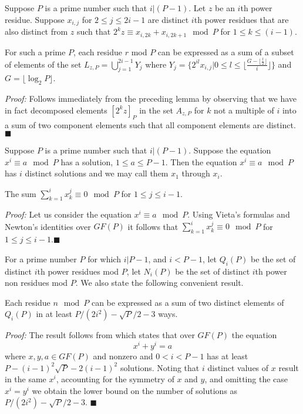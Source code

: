 \begin{lemma}\label{generates1} Suppose $P$ is a prime number such that $i|(P-1)$.
Let $z$ be an $i$th power residue. Suppose $x_{i,j}$ for $2 \leq j
\leq 2i-1$ are distinct $i$th power residues that are also
distinct from $z$ such that $2^{k}z \equiv x_{i,2k}+x_{i,2k+1}
\mod P$ for $1 \leq k \leq(i-1)$.

For such a prime $P$, each residue $r$ mod $P$ can be expressed as
a sum of a subset of elements of the set $L_{z,P}=
\bigcup_{j=1}^{2i-1} Y_j$ where $Y_j =\{2^{il}x_{i,j}| 0 \leq l
\leq \lfloor \frac{G-\lfloor \frac{l}{2}\rfloor}{i}\rfloor\}$ and
$G=\lfloor \log_2 P \rfloor $.
\end{lemma}
\noindent \textit{Proof:} Follows immediately from the preceding
lemma by observing that we have in fact decomposed elements
$[2^{k}z]_P$ in the set $A_{z,P}$ for $k$ not a multiple of $i$
into a sum of two component elements such that all component
elements are distinct.\hfill$\blacksquare$


Suppose $P$ is a prime number such that $i|(P-1)$. Suppose the
equation $x^i\equiv a \mod P$ has a solution, $1 \leq a \leq P-1$.
Then the equation $x^i\equiv a \mod P$ has $i$ distinct solutions
\cite{apostol} and we may call them $x_1$ through $x_i$.
\begin{lemma}\label{sums}
The sum $\sum_{k=1}^i x_k^j \equiv 0 \mod P$ for $1 \leq j \leq
i-1$.
\end{lemma}
\noindent \textit{Proof:} Let us consider the equation $x^i \equiv
a \mod P$. Using Vieta's formulas and Newton's identities over
$GF(P)$ it follows that
 $\sum_{k=1}^i x_k^j \equiv 0 \mod P$ for $1 \leq j \leq
i-1$.\hfill$\blacksquare$

For a prime number $P$ for which $i|P-1$, and $i<P-1$, let
$Q_i(P)$ be the set of distinct $i$th power residues mod $P$, let
$N_i(P)$ be the set of distinct $i$th power non residues mod $P$.
We also state the following convenient result.
\begin{lemma}\label{sums1}
Each residue $n \mod P$ can be expressed as a sum of two distinct
elements of $Q_i(P)$ in at least $P/(2i^2)-\sqrt{P}/2-3$ ways.
\end{lemma}
\noindent \textit{Proof:} The result follows from \cite{huavan:49}
which states that over $GF(P)$ the equation
\begin{equation}\label{hua} x^i+y^i=a
\end{equation} where $x,y,a \in GF(P)$ and nonzero and $0 < i <P-1 $
has at least $P-(i-1)^2\sqrt{P}-2(i-1)^2$ solutions. Noting that
$i$ distinct values of $x$ result in the same $x^i$, accounting
for the symmetry of $x$ and $y$, and omitting the case $x^i=y^i$
we obtain the lower bound on the number of solutions as
$P/(2i^2)-\sqrt{P}/2-3$. \hfill$\blacksquare$

